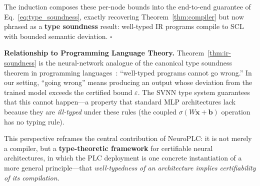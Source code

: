 The induction composes these per-node bounds into the
end-to-end guarantee of Eq.~\ref{eq:type_soundness}, exactly
recovering Theorem~\ref{thm:compiler} but now
phrased as a \textbf{type soundness} result: well-typed IR
programs compile to SCL with bounded semantic deviation. $\square$

\vspace{4pt}
\noindent\textbf{Relationship to Programming Language Theory.}
Theorem~\ref{thm:ir-soundness} is the neural-network analogue of the
canonical type soundness theorem in programming languages~\cite{milner1978theory}:
``well-typed programs cannot go wrong.'' In our setting, ``going wrong''
means producing an output whose deviation from the trained model exceeds
the certified bound $\varepsilon$. The SVNN type system guarantees that
this cannot happen---a property that standard MLP architectures lack
because they are \textit{ill-typed} under these rules (the coupled
$\sigma(W\mathbf{x} + \mathbf{b})$ operation has no typing rule).

This perspective reframes the central contribution of NeuroPLC: it is
not merely a compiler, but a \textbf{type-theoretic framework} for
certifiable neural architectures, in which the PLC deployment is one
concrete instantiation of a more general principle---that
\textit{well-typedness of an architecture implies certifiability of
its compilation}.
